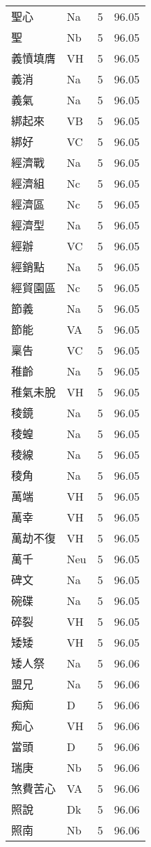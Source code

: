 \documentclass[twocolumn]{book}
\begin{document}
\begin{supertabular}{llrr}
聖心 & Na & 5 &  96.05\\
聖 & Nb & 5 &  96.05\\
義憤填膺 & VH & 5 &  96.05\\
義消 & Na & 5 &  96.05\\
義氣 & Na & 5 &  96.05\\
綁起來 & VB & 5 &  96.05\\
綁好 & VC & 5 &  96.05\\
經濟戰 & Na & 5 &  96.05\\
經濟組 & Nc & 5 &  96.05\\
經濟區 & Nc & 5 &  96.05\\
經濟型 & Na & 5 &  96.05\\
經辦 & VC & 5 &  96.05\\
經銷點 & Na & 5 &  96.05\\
經貿園區 & Nc & 5 &  96.05\\
節義 & Na & 5 &  96.05\\
節能 & VA & 5 &  96.05\\
稟告 & VC & 5 &  96.05\\
稚齡 & Na & 5 &  96.05\\
稚氣未脫 & VH & 5 &  96.05\\
稜鏡 & Na & 5 &  96.05\\
稜蝗 & Na & 5 &  96.05\\
稜線 & Na & 5 &  96.05\\
稜角 & Na & 5 &  96.05\\
萬端 & VH & 5 &  96.05\\
萬幸 & VH & 5 &  96.05\\
萬劫不復 & VH & 5 &  96.05\\
萬千 & Neu & 5 &  96.05\\
碑文 & Na & 5 &  96.05\\
碗碟 & Na & 5 &  96.05\\
碎裂 & VH & 5 &  96.05\\
矮矮 & VH & 5 &  96.05\\
矮人祭 & Na & 5 &  96.06\\
盟兄 & Na & 5 &  96.06\\
痴痴 & D & 5 &  96.06\\
痴心 & VH & 5 &  96.06\\
當頭 & D & 5 &  96.06\\
瑞庚 & Nb & 5 &  96.06\\
煞費苦心 & VA & 5 &  96.06\\
照說 & Dk & 5 &  96.06\\
照南 & Nb & 5 &  96.06\\

\end{supertabular}
\end{document}
